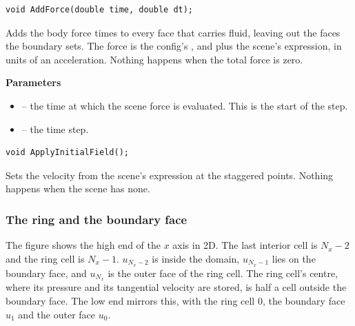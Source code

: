 \documentclass[10pt,a4paper]{article}
\newcommand{\code}[1]{\texttt{\detokenize{#1}}}
\newenvironment{params}{\par\noindent\textbf{Parameters}\begin{itemize}[leftmargin=1.4em,itemsep=0pt,topsep=1pt,parsep=0pt]}{\end{itemize}}
\newcommand{\p}[2]{\item \code{#1} -- #2}
\begin{document}
\begin{lstlisting}[style=sig]
void AddForce(double time, double dt);
\end{lstlisting}
Adds the body force times \code{dt} to every face that carries fluid, leaving out the faces the boundary sets. The
force is the config's \code{Fu}, \code{Fv} and \code{Fw} plus the scene's \code{force} expression, in units of an
acceleration. Nothing happens when the total force is zero.
\begin{params}
\p{time}{the time at which the scene force is evaluated. This is the start of the step.}
\p{dt}{the time step.}
\end{params}

\begin{lstlisting}[style=sig]
void ApplyInitialField();
\end{lstlisting}
Sets the velocity from the scene's \code{initial} expression at the staggered points. Nothing happens when the scene
has none.

\subsubsection*{The ring and the boundary face}

The figure shows the high end of the $x$ axis in 2D. The last interior cell is $N_x{-}2$ and the ring cell is
$N_x{-}1$. $u_{N_x-2}$ is inside the domain, $u_{N_x-1}$ lies on the boundary face, and $u_{N_x}$ is the outer face of
the ring cell. The ring cell's centre, where its pressure and its tangential velocity are stored, is half a cell
outside the boundary face. The low end mirrors this, with the ring cell 0, the boundary face $u_1$ and the outer face
$u_0$.

\begin{center}
\end{center}
\end{document}
